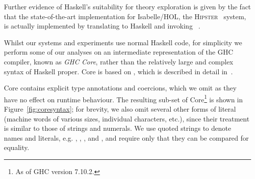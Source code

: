 Further evidence of Haskell's suitability for theory exploration is given by the
fact that the state-of-the-art implementation for Isabelle/HOL, the
\textsc{Hipster}~\cite{Hipster} system, is actually implemented by translating
to Haskell and invoking \hspec{}~\cite{claessen2013automating}.

Whilst our systems and experiments use normal Haskell code, for simplicity we
perform some of our analyses on an intermediate representation of the
\textsc{GHC} compiler, known as \emph{GHC Core}, rather than the relatively
large and complex syntax of Haskell proper. Core is based on \fc{}, which is
described in detail in~\cite[Appendix C]{sulzmann2007system}.

Core contains explicit type annotations and coercions, which we omit as they
have no effect on runtime behaviour. The resulting sub-set of Core\footnote{As
  of GHC version 7.10.2.} is shown in Figure~\ref{fig:coresyntax}; for brevity,
we also omit several other forms of literal (machine words of various sizes,
individual characters, etc.), since their treatment is similar to those of
strings and numerals. We use quoted strings to denote names and literals,
e.g. , , ,  and , and require only that they can be compared for
equality.

